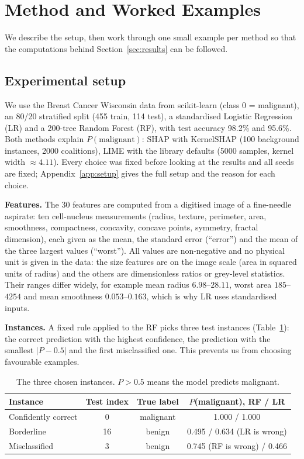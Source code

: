 \documentclass[11pt,a4paper]{article}
\begin{document}
\section{Method and Worked Examples}
We describe the setup, then work through one small example per method so that
the computations behind Section~\ref{sec:results} can be followed.
\subsection{Experimental setup}
We use the Breast Cancer Wisconsin data \cite{street} from scikit-learn
(class 0 = malignant), an 80/20 stratified split (455 train, 114 test), a
standardised Logistic Regression (LR) and a 200-tree Random Forest (RF), with
test accuracy 98.2\% and 95.6\%. Both methods explain $P(\text{malignant})$:
SHAP with KernelSHAP (100 background instances, 2000 coalitions), LIME with
the library defaults (5000 samples, kernel width $\approx 4.11$). Every choice
was fixed before looking at the results and all seeds are fixed;
Appendix~\ref{app:setup} gives the full setup and the reason for each choice.

\textbf{Features.} The 30 features are computed from a digitised image of a
fine-needle aspirate: ten cell-nucleus measurements (radius, texture,
perimeter, area, smoothness, compactness, concavity, concave points, symmetry,
fractal dimension), each given as the mean, the standard error (``error'') and
the mean of the three largest values (``worst''). All values are non-negative
and no physical unit is given in the data: the size features are on the image
scale (area in squared units of radius) and the others are dimensionless
ratios or grey-level statistics. Their ranges differ widely, for example mean
radius $6.98$--$28.11$, worst area $185$--$4254$ and mean smoothness
$0.053$--$0.163$, which is why LR uses standardised inputs.

\textbf{Instances.} A fixed rule applied to the RF picks three test instances
(Table~\ref{tab:instances}): the correct prediction with the highest
confidence, the prediction with the smallest $|P - 0.5|$ and the first
misclassified one. This prevents us from choosing favourable examples.

\begin{table}[!htb]
\centering\small
\caption{The three chosen instances. $P > 0.5$ means the model predicts malignant.}\label{tab:instances}
\begin{tabular}{lccc}
\toprule
\textbf{Instance} & \textbf{Test index} & \textbf{True label} & \textbf{$P$(malignant), RF / LR}\\
\midrule
Confidently correct & 0 & malignant & 1.000 / 1.000\\
Borderline & 16 & benign & 0.495 / 0.634 (LR is wrong)\\
Misclassified & 3 & benign & 0.745 (RF is wrong) / 0.466\\
\bottomrule
\end{tabular}
\end{table}
\end{document}
